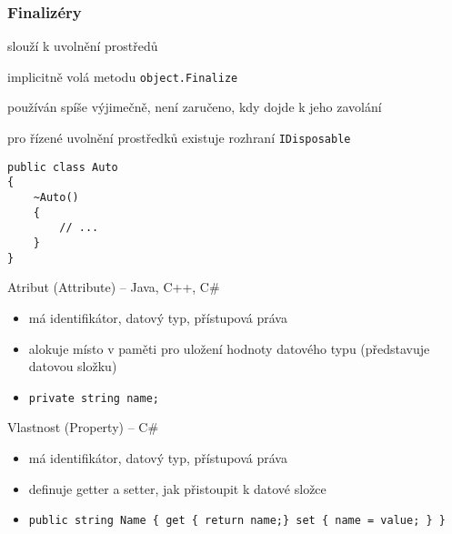 \begin{frame}[fragile]
\frametitle{Finalizéry}
\begin{bitemize}{}
\item slouží k uvolnění prostředů
\item implicitně volá metodu \lstinline|object.Finalize|
\item používán spíše výjimečně, není zaručeno, kdy dojde k jeho zavolání
\item pro řízené uvolnění prostředků existuje rozhraní \lstinline|IDisposable|
\end{bitemize}

\begin{yesblock}
\begin{lstlisting}
public class Auto 
{
    ~Auto() 
    {
        // ...
    }
}
\end{lstlisting}
\end{yesblock}
\end{frame}








\begin{frame}[fragile]
\begin{bitemize}{}
\item Atribut (Attribute) -- Java, C++, C\#
\begin{itemize}
\item má identifikátor, datový typ, přístupová práva
\item alokuje místo v paměti pro uložení hodnoty datového typu (představuje datovou složku)
\item \lstinline|private string name;|
\end{itemize}

\item Vlastnost (Property) -- C\#
\begin{itemize}
\item má identifikátor, datový typ, přístupová práva
\item definuje getter a setter, jak přistoupit k datové složce
\item \lstinline|public string Name { get { return name;} set { name = value; } }|
\end{itemize}
\end{bitemize}
\end{frame}



